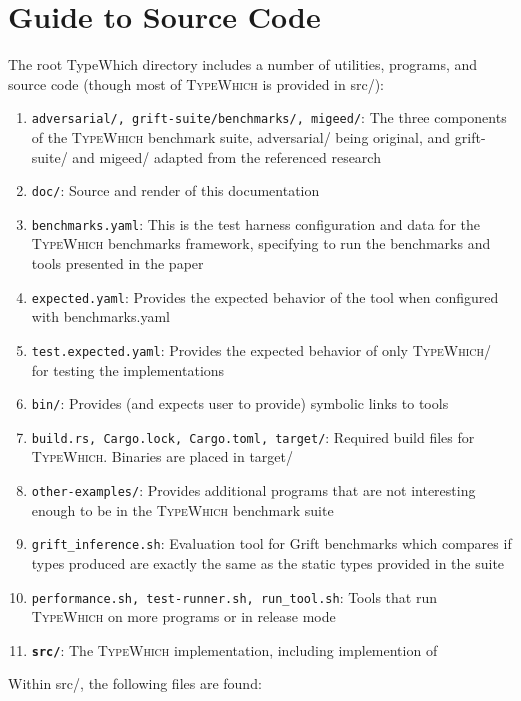 \documentclass{book}
\newcommand{\system}{\textsc{TypeWhich}\xspace}
\begin{document}
\chapter{Guide to Source Code}

The root TypeWhich directory includes a number of utilities, programs, and
source code (though most of \system is provided in src/):

\begin{enumerate}
    \item \texttt{adversarial/, grift-suite/benchmarks/, migeed/}: The three
    components of the \system benchmark suite, adversarial/ being original, and
    grift-suite/ and migeed/ adapted from the referenced research
    \item \texttt{doc/}: Source and render of this documentation
    \item \texttt{benchmarks.yaml}: This is the test harness configuration and data
    for the \system benchmarks framework, specifying to run the benchmarks and
    tools presented in the paper
    \item \texttt{expected.yaml}: Provides the expected behavior of the tool when
    configured with benchmarks.yaml
    \item \texttt{test.expected.yaml}: Provides the expected behavior of only
    \system / \citet{rastogi:gti} for testing the implementations
    \item \texttt{bin/}: Provides (and expects user to provide) symbolic links to tools
    \item \texttt{build.rs, Cargo.lock, Cargo.toml, target/}: Required build files for
    \system. Binaries are placed in target/
    \item \texttt{other-examples/}: Provides additional programs that are not
    interesting enough to be in the \system benchmark suite
    \item \texttt{grift\_inference.sh}: Evaluation tool for Grift benchmarks
    which compares if types produced are exactly the same as the static types
    provided in the suite
    \item \texttt{performance.sh, test-runner.sh, run\_tool.sh}: Tools that run
    \system on more programs or in release mode
    \item \textbf{\texttt{src/}}: The \system implementation, including implemention of
    \citet{rastogi:gti}
\end{enumerate}

Within src/, the following files are found:
\end{document}
